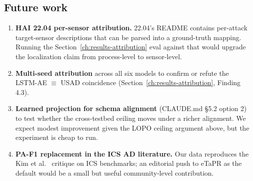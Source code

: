 \subsection{Future work}
\label{sec:future}

\begin{enumerate}
  \item \textbf{HAI 22.04 per-sensor attribution.}  22.04's README contains per-attack target-sensor descriptions that can be parsed into a ground-truth mapping.  Running the Section~\ref{ch:results-attribution} eval against that would upgrade the localization claim from process-level to sensor-level.
  \item \textbf{Multi-seed attribution} across all six models to confirm or refute the LSTM-AE $\equiv$ USAD coincidence (Section~\ref{ch:results-attribution}, Finding 4.3).
  \item \textbf{Learned projection for schema alignment} (CLAUDE.md \S5.2 option 2) to test whether the cross-testbed ceiling moves under a richer alignment.  We expect modest improvement given the LOPO ceiling argument above, but the experiment is cheap to run.
  \item \textbf{PA-F1 replacement in the ICS AD literature.}  Our data reproduces the Kim et al.~\cite{kim2022towards} critique on ICS benchmarks; an editorial push to eTaPR as the default would be a small but useful community-level contribution.
\end{enumerate}
